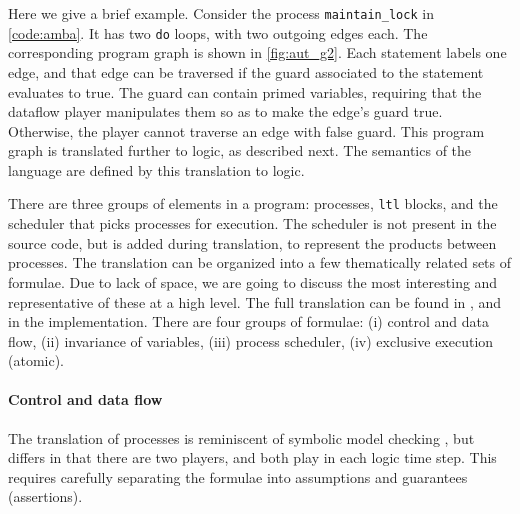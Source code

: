 \documentclass[copyright]{eptcs}
\begin{document}
Here we give a brief example.
Consider the process \texttt{maintain\_lock} in \cref{code:amba}.
It has two \texttt{do} loops, with two outgoing edges each.
The corresponding program graph is shown in \cref{fig:aut_g2}.
Each statement labels one edge, and that edge can be traversed if the guard associated to the statement evaluates to true.
The guard can contain primed variables, requiring that the dataflow player manipulates them so as to make the edge's guard true.
Otherwise, the player cannot traverse an edge with false guard.
This program graph is translated further to logic, as described next.
The semantics of the language are defined by this translation to logic.

There are three groups of elements in a program: processes, \texttt{ltl} blocks, and the scheduler that picks processes for execution.
The scheduler is not present in the source code, but is added during translation, to represent the products between processes.
The translation can be organized into a few thematically related sets of formulae.
Due to lack of space, we are going to discuss the most interesting and representative of these at a high level.
The full translation can be found in \cite{Filippidis15cds3-synt}, and in the implementation.
There are four groups of formulae:
(i) control and data flow,
(ii) invariance of variables,
(iii) process scheduler,
(iv) exclusive execution (atomic).


\paragraph{Control and data flow}

The translation of processes is reminiscent of symbolic model checking \cite{McMillan92phd}, but differs in that there are two players, and both play in each logic time step.
This requires carefully separating the formulae into assumptions and guarantees (assertions).
\end{document}
